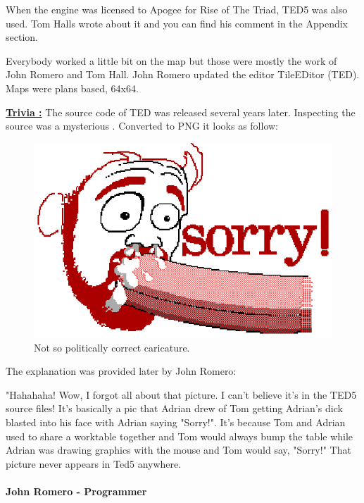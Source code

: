 \documentclass[book.tex]{subfiles}
\begin{document}
When the engine was licensed to Apogee for Rise of The Triad, TED5 was also used. Tom Halls wrote about it and you can find his comment in the Appendix section.
\par
Everybody worked a little bit on the map but those were mostly the work of John Romero and Tom Hall. John Romero updated the editor TileEDitor (TED). Maps were plans based, 64x64.\\
\par
 \textbf{\underline{Trivia :}} The source code of TED was released several years later. Inspecting the source was a mysterious . Converted to PNG it looks as follow:\\
\begin{figure}[H]
\centering
 \includegraphics[width=\textwidth]{imgs/_tom.eps}
 \caption{Not so politically correct caricature.} \label{fig:mips}
 \end{figure}
The explanation was provided later by John Romero:\\
 \begin{fancyquotes}
   "Hahahaha! Wow, I forgot all about that picture. I can't believe it's 
in the TED5 source files! It's basically a pic that Adrian drew of Tom 
getting Adrian's dick blasted into his face with Adrian saying "Sorry!". 
It's because Tom and Adrian used to share a worktable together and Tom 
would always bump the table while Adrian was drawing graphics with the 
mouse and Tom would say, "Sorry!" That picture never appears in Ted5 
anywhere.\\
   \\
\textbf{John Romero - Programmer}
 \end{fancyquotes}\\
\end{document}
